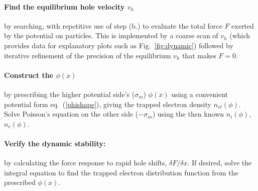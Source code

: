 \documentclass[pre]{revtex4-2}
\begin{document}
\paragraph{Find the equilibrium hole velocity $v_h$} by searching,
with repetitive use of step (b.) to evaluate the total force $F$ exerted
by the potential on particles. This is implemented by a coarse scan of
$v_h$ (which provides data for explanatory plots such as Fig.\
\ref{fig:dynamic}) followed by iterative refinement of the precision
of the equilibrium $v_h$ that makes $F=0$.

\paragraph{Construct the $\phi(x)$} by prescribing the higher
potential side's ($\sigma_m$) $\phi(x)$ using a convenient potential
form eq.\ (\ref{phishape}), giving the trapped electron density
$n_{et}(\phi)$. Solve Poisson's equation on the other side
($-\sigma_m$) using the then known $n_i(\phi)$, $n_e(\phi)$.

\paragraph{Verify the dynamic stability:} 
by calculating the force response to rapid hole shifts,
$\delta F/\delta x$.  If desired, solve the integral equation to find
the trapped electron distribution function from the prescribed
$\phi(x)$.
\end{document}
